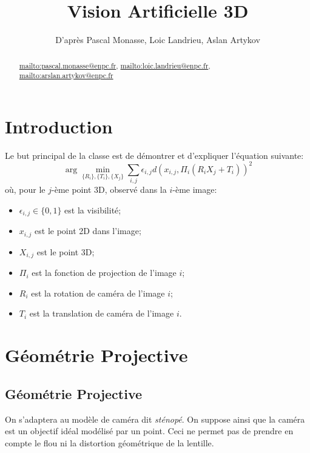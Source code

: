 \documentclass[info, math]{mpb-cours}
\title{Vision Artificielle 3D}
\author{D'après Pascal Monasse, Loic Landrieu, Aslan Artykov}
\begin{document}
\bettertitle
\begin{abstract}
	\url{mailto:pascal.monasse@enpc.fr}, \url{mailto:loic.landrieu@enpc.fr}, \url{mailto:arslan.artykov@enpc.fr}
\end{abstract}

\section*{Introduction}
\noindent Le but principal de la classe est de démontrer et d'expliquer l'équation suivante:
\begin{equation*}
	\arg \min_{\{R_{i}\}, \{T_{i}\}, \{X_{j}\}} \sum_{i, j} \epsilon_{i, j}d\left(x_{i, j}, \Pi_{i}(R_{i}X_{j} + T_{i})\right)^{2}
\end{equation*}
où, pour le $j$-ème point 3D, observé dans la $i$-ème image:
\begin{itemize}
	\item $\epsilon_{i, j} \in \{0, 1\}$ est la visibilité;
	\item $x_{i, j}$ est le point 2D dans l'image;
	\item $X_{i, j}$ est le point 3D;
	\item $\Pi_{i}$ est la fonction de projection de l'image $i$;
	\item $R_{i}$ est la rotation de caméra de l'image $i$;
	\item $T_{i}$ est la translation de caméra de l'image $i$.
\end{itemize}

\section{Géométrie Projective}
\subsection{Géométrie Projective}
On s'adaptera au modèle de caméra dit \emph{sténopé}.
On suppose ainsi que la caméra est un objectif idéal modélisé par un point.
Ceci ne permet pas de prendre en compte le flou ni la distortion géométrique de la lentille.
\end{document}
